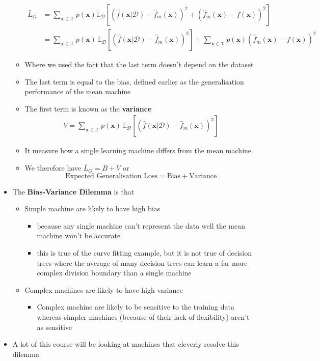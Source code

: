 \documentclass[11pt]{article}
\newcommand{\av}[2][]{\mathbb{E}_{#1\!}\left[ #2 \right]}
\begin{document}
\begin{itemize}
\begin{itemize}
\begin{align*}
      \bar{L}_G &= \sum_{\bm{x}\in\mathcal{X}} p(\bm{x})
      \av[\mathcal{D}]{ 
      \left(\hat{f}(\bm{x}\vert \mathcal{D}) -
      \hat{f}_m(\bm{x}) \right)^2 + \left(
      \hat{f}_m(\bm{x}) - f(\bm{x}) \right)^2 } \\
       &= \sum_{\bm{x}\in\mathcal{X}} p(\bm{x})\, 
       \av[\mathcal{D}]{ \left(\hat{f}(\bm{x}\vert \mathcal{D}) -
      \hat{f}_m(\bm{x})\right)^2 } +
     \sum_{\bm{x}\in\mathcal{X}} p(\bm{x}) \left( \hat{f}_m(\bm{x})
- f(\bm{x}) \right)^2 
\end{align*}
\item Where we used the fact that the last term doesn't depend on
the dataset
\item The last term is equal to the bias, defined earlier as the
generalisation performance of the mean machine
\item The first term is known as the \textbf{variance}
\begin{align*}
  V = \sum_{\bm{x}\in\mathcal{X}} p(\bm{x})\,
  \av[\mathcal{D}]{ \left(\hat{f}(\bm{x}\vert \mathcal{D}) -
  \hat{f}_m(\bm{x})\right)^2 } 
\end{align*}
\item It measure how a single learning machine differs from the mean machine
\item We therefore have \(\bar{L}_G = B + V\) or
$$ \text{Expected Generalisation Loss} = \text{Bias} +
        \text{Variance} $$
\end{itemize}
\item The \textbf{Bias-Variance Dilemma} is that
\begin{itemize}
\item Simple machine are likely to have high bias
\begin{itemize}
\item because any single machine can't represent the data well the
mean machine won't be accurate
\item this is true of the curve fitting example, but it is not
true of decision trees where the average of many decision
trees can learn a far more complex division boundary than a
single machine
\end{itemize}
\item Complex machines are likely to have high variance
\begin{itemize}
\item Complex machine are likely to be sensitive to the training
data whereas simpler machines (because of their lack of
flexibility) aren't as sensitive
\end{itemize}
\end{itemize}
\item A lot of this course will be looking at machines that cleverly
resolve this dilemma
\end{itemize}
\end{document}
